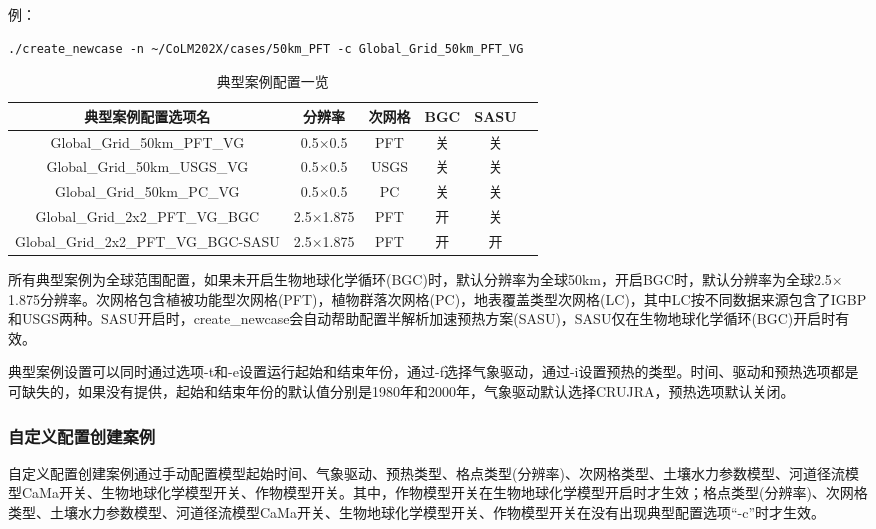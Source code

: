 \documentclass[a4paper,12pt,twoside]{article}
\begin{document}
例：
\begin{lstlisting}
./create_newcase -n ~/CoLM202X/cases/50km_PFT -c Global_Grid_50km_PFT_VG
\end{lstlisting}

\begin{table}[!htbp]
\renewcommand{\arraystretch}{1.5}
\centering 
\caption{典型案例配置一览}\label{tab:cases_config}
\begin{tabular}{
cccccc} \toprule
\textbf{典型案例配置选项名} & \textbf{分辨率} & \textbf{次网格} & \textbf{BGC} &\textbf{SASU}\\ \midrule
Global\_Grid\_50km\_PFT\_VG & 0.5$\times$0.5 & PFT & 关 &关\\
Global\_Grid\_50km\_USGS\_VG & 0.5$\times$0.5 & USGS & 关 &关\\
Global\_Grid\_50km\_PC\_VG & 0.5$\times$0.5 & PC & 关 & 关\\
Global\_Grid\_2x2\_PFT\_VG\_BGC & 2.5$\times$1.875 & PFT& 开 &关\\
Global\_Grid\_2x2\_PFT\_VG\_BGC-SASU & 2.5$\times$1.875 & PFT& 开 & 开\\
\bottomrule
\end{tabular}
\end{table}

所有典型案例为全球范围配置，如果未开启生物地球化学循环(BGC)时，默认分辨率为全球50km，开启BGC时，默认分辨率为全球2.5$\times$1.875分辨率。次网格包含植被功能型次网格(PFT)，植物群落次网格(PC)，地表覆盖类型次网格(LC)，其中LC按不同数据来源包含了IGBP和USGS两种。SASU开启时，create\_newcase会自动帮助配置半解析加速预热方案(SASU)，SASU仅在生物地球化学循环(BGC)开启时有效。

典型案例设置可以同时通过选项-t和-e设置运行起始和结束年份，通过-f选择气象驱动，通过-i设置预热的类型。时间、驱动和预热选项都是可缺失的，如果没有提供，起始和结束年份的默认值分别是1980年和2000年，气象驱动默认选择CRUJRA，预热选项默认关闭。


\subsubsection{自定义配置创建案例}

自定义配置创建案例通过手动配置模型起始时间、气象驱动、预热类型、格点类型(分辨率)、次网格类型、土壤水力参数模型、河道径流模型CaMa开关、生物地球化学模型开关、作物模型开关。其中，作物模型开关在生物地球化学模型开启时才生效；格点类型(分辨率)、次网格类型、土壤水力参数模型、河道径流模型CaMa开关、生物地球化学模型开关、作物模型开关在没有出现典型配置选项“-c”时才生效。
\end{document}
